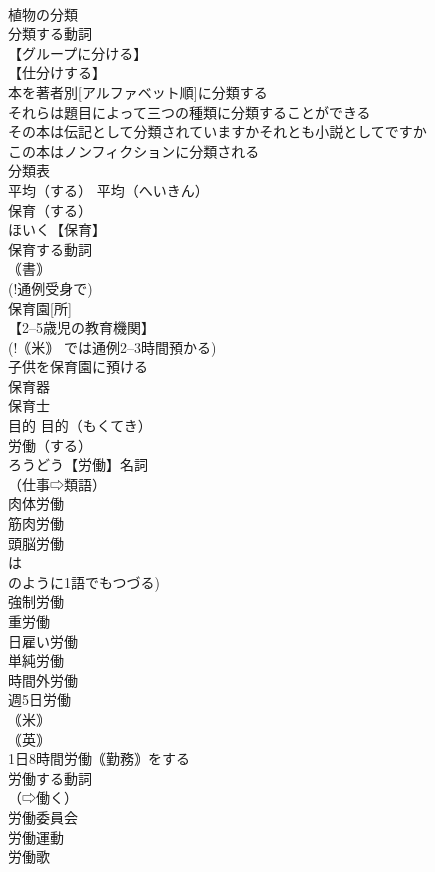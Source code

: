 \documentclass[8pt]{extreport}
\begin{document}
\begin{CJK}{UTF8}{min}
\\	植物の分類
\\	分類する動詞
\\	【グループに分ける】
\\	【仕分けする】
\\	本を著者別[アルファベット順]に分類する
\\	それらは題目によって三つの種類に分類することができる
\\	その本は伝記として分類されていますかそれとも小説としてですか
\\	この本はノンフィクションに分類される
\\	分類表
\\	平均（する）		平均（へいきん）
\\	保育（する）		
\\	ほいく【保育】
\\	保育する動詞
\\	｟書｠
\\	(!通例受身で) 
\\	保育園[所]
\\	【2--5歳児の教育機関】
\\	(!｟米｠ では通例2--3時間預かる)
\\	子供を保育園に預ける
\\	保育器
\\	保育士
\\	目的		目的（もくてき）
\\	労働（する）		
\\	ろうどう【労働】名詞
\\	（仕事⇨類語）
\\	肉体労働
\\	筋肉労働
\\	頭脳労働
\\	は 
\\	のように1語でもつづる)
\\	強制労働
\\	重労働
\\	日雇い労働
\\	単純労働
\\	時間外労働
\\	週5日労働
\\	｟米｠
\\	｟英｠
\\	1日8時間労働｟勤務｠をする
\\	労働する動詞
\\	（⇨働く）
\\	労働委員会
\\	労働運動
\\	労働歌

\end{CJK}
\end{document}
